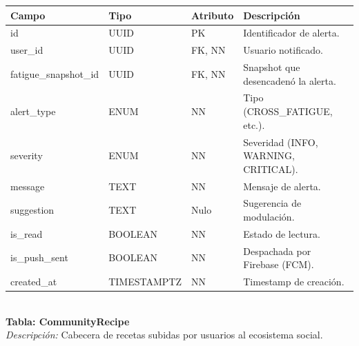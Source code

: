 \documentclass[12pt]{article}
\begin{document}
\begin{table}[h!]
    \centering
    \renewcommand{\arraystretch}{1.2}
    \small
    \begin{tabular}{|p{3.5cm}|p{2.7cm}|p{2cm}|p{6.5cm}|}
        \hline
        \rowcolor[HTML]{EFEFEF}
        \textbf{Campo} & \textbf{Tipo} & \textbf{Atributo} & \textbf{Descripción} \\ \hline
        id & UUID & PK & Identificador de alerta. \\ \hline
        user\_id & UUID & FK, NN & Usuario notificado. \\ \hline
        fatigue\_snapshot\_id & UUID & FK, NN & Snapshot que desencadenó la alerta. \\ \hline
        alert\_type & ENUM & NN & Tipo (CROSS\_FATIGUE, etc.). \\ \hline
        severity & ENUM & NN & Severidad (INFO, WARNING, CRITICAL). \\ \hline
        message & TEXT & NN & Mensaje de alerta. \\ \hline
        suggestion & TEXT & Nulo & Sugerencia de modulación. \\ \hline
        is\_read & BOOLEAN & NN & Estado de lectura. \\ \hline
        is\_push\_sent & BOOLEAN & NN & Despachada por Firebase (FCM). \\ \hline
        created\_at & TIMESTAMPTZ & NN & Timestamp de creación. \\ \hline
    \end{tabular}
\end{table}
\\
\noindent\textbf{Tabla: CommunityRecipe} \\
\textit{Descripción:} Cabecera de recetas subidas por usuarios al ecosistema social.
\end{document}
